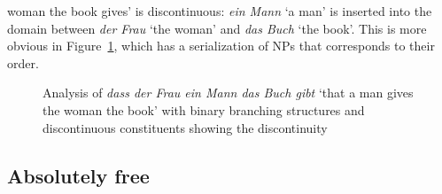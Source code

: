 \documentclass[output=paper]{langsci/langscibook}
\begin{document}
woman the book gives' is discontinuous: \emph{ein Mann} `a man' is inserted into the domain between
\emph{der Frau} `the woman' and \emph{das Buch} `the book'.  This is more obvious in Figure~\ref{fig-the-child-reads-the-book-reape-binary-discont}, which has a serialization of NPs that
corresponds to their order.
\begin{figure}
\caption{\label{fig-the-child-reads-the-book-reape-binary-discont}Analysis of \emph{dass der Frau ein Mann das Buch
    gibt} `that a man gives the woman the book' with binary branching structures and discontinuous
  constituents showing the discontinuity}
\end{figure}%


\subsection{Absolutely free}
\label{sec-absolutely-free}
\end{document}
